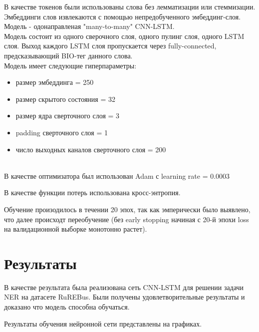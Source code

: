 \documentclass{article}
\begin{document}
\vspace{14pt}

В качестве токенов были использованы слова без лемматизации или стеммизации. \\ %

Эмбеддинги слов извлекаются с помощью непредобученного эмбеддинг-слоя. \\

Модель - одонаправленая "many-to-many"  CNN-LSTM. \\

Модель состоит из одного сверочного слоя, одного пулинг слоя, одного LSTM слоя. Выход каждого LSTM слоя пропускается через fully-connected, предсказывающий BIO-тег данного слова. \\

Модель имеет следующие гиперпараметры:
\begin{itemize}
    \item размер эмбеддинга = 250
    \item размер скрытого состояния = 32 
    \item размер ядра сверточного слоя = 3
    \item padding сверточного слоя = 1
    \item число выходных каналов сверточного слоя = 200
\end{itemize}

\\

В качестве оптимизатора был использован Adam с learning rate = 0.0003

В качестве функции потерь использована кросс-энтропия.

Обучение произодилось в течении 20 эпох, так как эмперически было выявлено, что далее происходт переобучение (без early stopping начиная с 20-й эпохи loss на валидационной выборке монотонно растет).

\section{Результаты}
В качестве результата была реализована сеть CNN-LSTM для решении задачи NER на датасете RuREBus. Были получены удовлетворительные результаты и доказано что модель способна обучаться.

Результаты обучения нейронной сети представлены на графиках.
\end{document}
